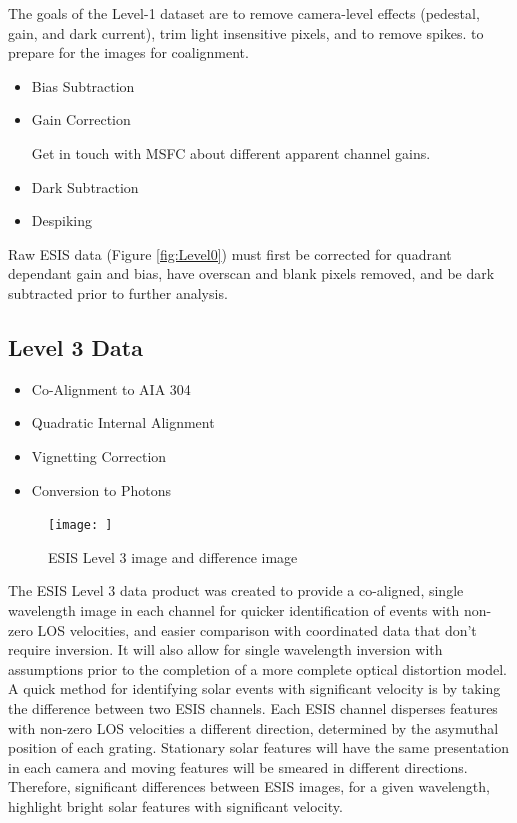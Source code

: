         The goals of the Level-1 dataset are to remove camera-level effects (pedestal, gain, and dark current), trim light insensitive pixels, and to remove spikes. to prepare for the images for coalignment.
    
        \begin{itemize}
            \item Bias Subtraction
            \item Gain Correction
         
            
                 Get in touch with MSFC about different apparent channel gains.
            \item Dark Subtraction
            \item Despiking
        \end{itemize}
       Raw ESIS data (Figure \ref{fig:Level0}) must first be corrected for quadrant dependant gain and bias, have overscan and blank pixels removed, and be dark subtracted prior to further analysis.
       
	       


    \subsection{Level 3 Data}
        \begin{itemize}
            \item Co-Alignment to AIA 304
            \item Quadratic Internal Alignment
            \item Vignetting Correction
            \item Conversion to Photons
        \end{itemize}
        
        \begin{figure}
            \centering
            \texttt{[image: ]}
            \caption{ESIS Level 3 image and difference image}
            \label{fig:L3}
        \end{figure}
        
        The ESIS Level 3 data product was created to provide a co-aligned, single wavelength image in each channel for quicker identification of events with non-zero LOS velocities, and easier comparison with coordinated data that don't require inversion. 
        It will also allow for single wavelength inversion with assumptions prior to the completion of a more complete optical distortion model. 
        A quick method for identifying solar events with significant velocity is by taking the difference between two ESIS channels.
        Each ESIS channel disperses features with non-zero LOS velocities a different direction, determined by the asymuthal position of each grating. 
        Stationary solar features will have the same presentation in each camera and moving features will be smeared in different directions.
        Therefore, significant differences between ESIS images, for a given wavelength, highlight bright solar features with significant velocity.
        
